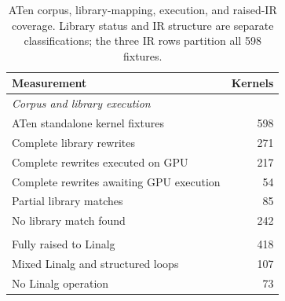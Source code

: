 \begin{table}[t]
  \centering
  \small
  \caption{ATen corpus, library-mapping, execution, and raised-IR coverage. Library status and IR structure are separate classifications; the three IR rows partition all 598 fixtures.}
  \label{tab:aten-coverage-summary}
  \begin{tabular}{lr}
    \toprule
    Measurement & Kernels \\
    \midrule
    \multicolumn{2}{l}{\textit{Corpus and library execution}} \\
    ATen standalone kernel fixtures & 598 \\
    Complete library rewrites & 271 \\
    Complete rewrites executed on GPU & 217 \\
    Complete rewrites awaiting GPU execution & 54 \\
    Partial library matches & 85 \\
    No library match found & 242 \\
    \addlinespace
    \multicolumn{2}{l}{\textit{Raised-IR structure}} \\
    Fully raised to Linalg & 418 \\
    Mixed Linalg and structured loops & 107 \\
    No Linalg operation & 73 \\
    \bottomrule
  \end{tabular}
\end{table}
